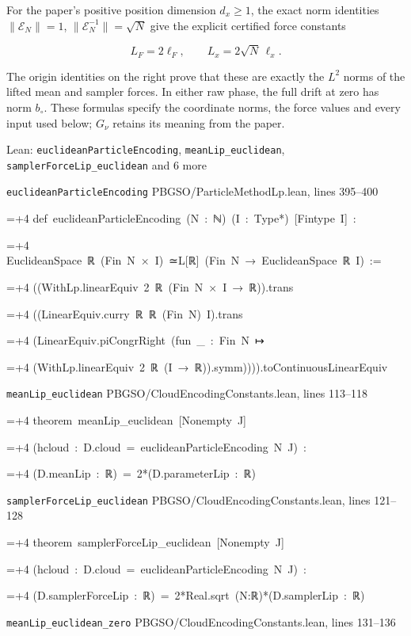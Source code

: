 \documentclass[11pt,a4paper]{report}
\newlength{\leancharwidth}
\newenvironment{leancode}{\par\smallskip\begingroup\ttfamily\footnotesize\raggedright
  \settowidth{\leancharwidth}{M}\setlength{\parskip}{0pt}\setlength{\parindent}{0pt}
  \frenchspacing}{\par\endgroup\smallskip}
\newcommand{\leanline}[2]{\hangindent=\dimexpr#1\leancharwidth+4\leancharwidth\relax
  \hangafter=1\noindent\hspace*{#1\leancharwidth}#2\par}
\newcommand{\leansource}[1]{\par{\footnotesize\color{leanmuted}#1}\par}
\begin{document}
For the paper’s positive position dimension \(d_x\ge1\), the exact norm identities \(\|\mathcal E_N\|=1\), \(\|\mathcal E_N^{-1}\|=\sqrt N\) give the explicit certified force constants



\[L_F=2\ell_F,\qquad L_x=2\sqrt N\,\ell_x.\]



The origin identities on the right prove that these are exactly the \(L^2\) norms of the lifted mean and sampler forces. In either raw phase, the full drift at zero has norm \(b_\circ\). These formulas specify the coordinate norms, the force values and every input used below; \(G_\nu\) retains its meaning from the paper.

\begin{leanbox}{Lean: \texttt{euclideanParticleEncoding}, \texttt{meanLip\_\allowbreak{}euclidean}, \texttt{samplerForceLip\_\allowbreak{}euclidean} and 6 more}
\leansource{\texttt{euclideanParticleEncoding} \quad PBGSO/\allowbreak{}ParticleMethodLp.lean, lines 395–400}
\begin{leancode}
\leanline{0}{def\ euclideanParticleEncoding\ (N\ :\ ℕ)\ (I\ :\ Type*)\ [Fintype\ I]\ :}
\leanline{4}{EuclideanSpace\ ℝ\ (Fin\ N\ ×\ I)\ ≃L[ℝ]\ (Fin\ N\ →\ EuclideanSpace\ ℝ\ I)\ :=}
\leanline{2}{((WithLp.linearEquiv\ 2\ ℝ\ (Fin\ N\ ×\ I\ →\ ℝ)).trans}
\leanline{4}{((LinearEquiv.curry\ ℝ\ ℝ\ (Fin\ N)\ I).trans}
\leanline{6}{(LinearEquiv.piCongrRight\ (fun\ \_\ :\ Fin\ N\ ↦}
\leanline{8}{(WithLp.linearEquiv\ 2\ ℝ\ (I\ →\ ℝ)).symm)))).toContinuousLinearEquiv}
\end{leancode}
\leansource{\texttt{meanLip\_\allowbreak{}euclidean} \quad PBGSO/\allowbreak{}CloudEncodingConstants.lean, lines 113–118}
\begin{leancode}
\leanline{0}{theorem\ meanLip\_euclidean\ [Nonempty\ J]}
\leanline{4}{(hcloud\ :\ D.cloud\ =\ euclideanParticleEncoding\ N\ J)\ :}
\leanline{4}{(D.meanLip\ :\ ℝ)\ =\ 2*(D.parameterLip\ :\ ℝ)}
\end{leancode}
\leansource{\texttt{samplerForceLip\_\allowbreak{}euclidean} \quad PBGSO/\allowbreak{}CloudEncodingConstants.lean, lines 121–128}
\begin{leancode}
\leanline{0}{theorem\ samplerForceLip\_euclidean\ [Nonempty\ J]}
\leanline{4}{(hcloud\ :\ D.cloud\ =\ euclideanParticleEncoding\ N\ J)\ :}
\leanline{4}{(D.samplerForceLip\ :\ ℝ)\ =\ 2*Real.sqrt\ (N:ℝ)*(D.samplerLip\ :\ ℝ)}
\end{leancode}
\leansource{\texttt{meanLip\_\allowbreak{}euclidean\_\allowbreak{}zero} \quad PBGSO/\allowbreak{}CloudEncodingConstants.lean, lines 131–136}

\end{leanbox}
\end{document}

